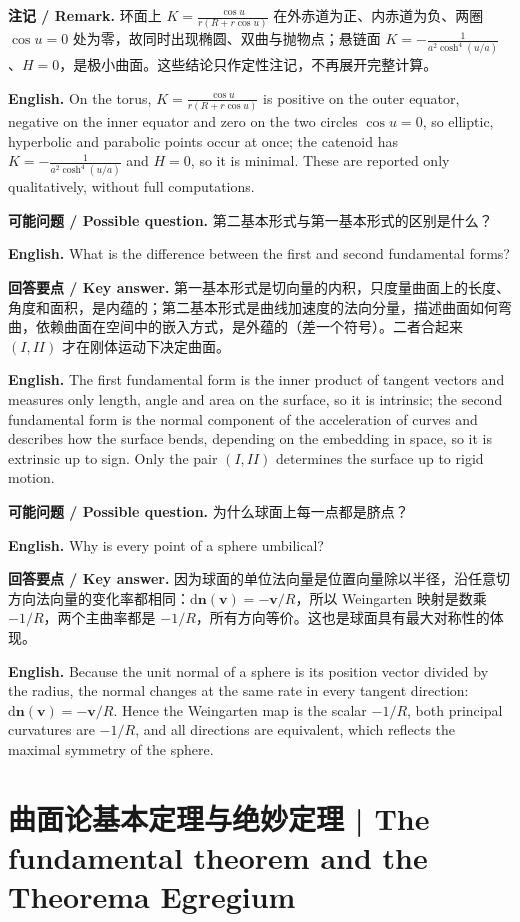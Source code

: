 \documentclass[UTF8,11pt,a4paper]{ctexart}
\newcommand{\EN}[1]{\par\noindent \textbf{English.} #1\par}
\newcommand{\ASK}[4]{\par\noindent \textbf{可能问题 / Possible question.} #1\par\EN{#2}\noindent \textbf{回答要点 / Key answer.} #3\par\EN{#4}\medskip}
\newcommand{\REM}[2]{\par\noindent\textbf{注记 / Remark.} #1\par\EN{#2}\par\smallskip}
\newcommand{\dd}{\mathrm{d}}
\newcommand{\bn}{\mathbf{n}}
\newcommand{\bv}{\mathbf{v}}
\begin{document}
\REM{环面上 $K=\frac{\cos u}{r(R+r\cos u)}$ 在外赤道为正、内赤道为负、两圈 $\cos u=0$ 处为零，故同时出现椭圆、双曲与抛物点；悬链面 $K=-\frac{1}{a^2\cosh^4(u/a)}$、$H=0$，是极小曲面。这些结论只作定性注记，不再展开完整计算。}{On the torus, $K=\frac{\cos u}{r(R+r\cos u)}$ is positive on the outer equator, negative on the inner equator and zero on the two circles $\cos u=0$, so elliptic, hyperbolic and parabolic points occur at once; the catenoid has $K=-\frac{1}{a^2\cosh^4(u/a)}$ and $H=0$, so it is minimal. These are reported only qualitatively, without full computations.}
\ASK{第二基本形式与第一基本形式的区别是什么？}{What is the difference between the first and second fundamental forms?}{第一基本形式是切向量的内积，只度量曲面上的长度、角度和面积，是内蕴的；第二基本形式是曲线加速度的法向分量，描述曲面如何弯曲，依赖曲面在空间中的嵌入方式，是外蕴的（差一个符号）。二者合起来 $(I,II)$ 才在刚体运动下决定曲面。}{The first fundamental form is the inner product of tangent vectors and measures only length, angle and area on the surface, so it is intrinsic; the second fundamental form is the normal component of the acceleration of curves and describes how the surface bends, depending on the embedding in space, so it is extrinsic up to sign. Only the pair $(I,II)$ determines the surface up to rigid motion.}
\ASK{为什么球面上每一点都是脐点？}{Why is every point of a sphere umbilical?}{因为球面的单位法向量是位置向量除以半径，沿任意切方向法向量的变化率都相同：$\dd\bn(\bv)=-\bv/R$，所以 Weingarten 映射是数乘 $-1/R$，两个主曲率都是 $-1/R$，所有方向等价。这也是球面具有最大对称性的体现。}{Because the unit normal of a sphere is its position vector divided by the radius, the normal changes at the same rate in every tangent direction: $\dd\bn(\bv)=-\bv/R$. Hence the Weingarten map is the scalar $-1/R$, both principal curvatures are $-1/R$, and all directions are equivalent, which reflects the maximal symmetry of the sphere.}

\section[曲面论基本定理]{曲面论基本定理与绝妙定理 | The fundamental theorem and the Theorema Egregium}
\end{document}
